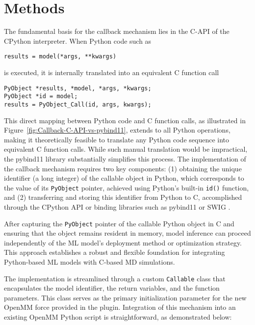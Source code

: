 \section{Methods}

The fundamental basis for the callback mechanism lies
in the C-API of the CPython interpreter. When Python code such as

\footnotesize\begin{verbatim}
results = model(*args, **kwargs)
\end{verbatim}\normalsize
is executed, it is internally translated into an equivalent C function call

\footnotesize\begin{verbatim}
PyObject *results, *model, *args, *kwargs;
PyObject *id = model;
results = PyObject_Call(id, args, kwargs);
\end{verbatim}\normalsize
This direct mapping between Python code and C function calls,
as illustrated in Figure~\ref{fig:Callback-C-API-vs-pybind11},
extends to all Python operations,
making it theoretically feasible to translate any Python code sequence
into equivalent C function calls.
While such manual translation would be impractical,
the pybind11 library \cite{Software-pybind11} substantially simplifies this process.
The implementation of the callback mechanism requires two key components:
(1) obtaining the unique identifier (a long integer) of the callable object in
Python,
which corresponds to the value of its \verb|PyObject| pointer,
achieved using Python's built-in \verb|id()| function, and
(2) transferring and storing this identifier from Python to C,
accomplished through the CPython API or binding libraries
such as pybind11 or SWIG \cite{Software-SWIG}.

After capturing the \verb|PyObject| pointer of the callable Python object
in C and ensuring that the object remains resident in memory,
model inference can proceed independently
of the ML model's deployment method or optimization strategy.
This approach establishes a robust and flexible foundation
for integrating Python-based ML models with C-based MD simulations.

\ifdefined\InlineFloatEnv

\else\fi

The implementation is streamlined through a custom \verb|Callable| class
that encapsulates the model identifier, the return variables,
and the function parameters.
This class serves as the primary initialization parameter
for the new OpenMM force provided in the plugin.
Integration of this mechanism into an existing OpenMM Python script
is straightforward, as demonstrated below:

